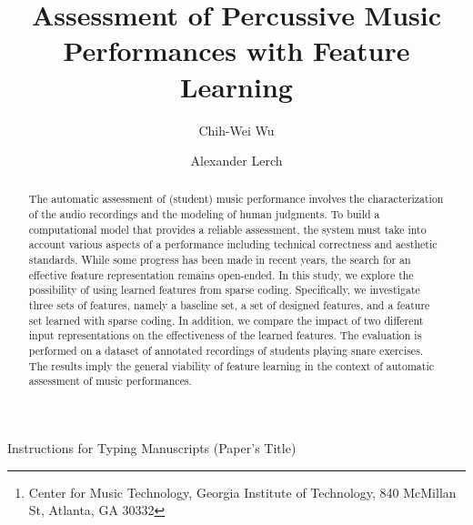 \documentclass{ws-ijsc}
\begin{document}
{Instructions for Typing Manuscripts (Paper's Title)}

%
\catchline{}{}{}{}{}
%

\title{Assessment of Percussive Music Performances with Feature Learning}


\author{Chih-Wei Wu}

\address{Center for Music Technology\\
Georgia Institute of Technology\,\footnote{Center for Music Technology, Georgia Institute of Technology, 840 McMillan St, Atlanta, GA 30332}\\
}

\author{Alexander Lerch}

\address{Center for Music Technology\\
Georgia Institute of Technology\\
alexander.lerch@gatech.edu
}

\maketitle

\begin{history}
\end{history}

\begin{abstract}
The automatic assessment of (student) music performance involves the characterization of the audio recordings and the modeling of human judgments. To build a computational model that provides a reliable assessment, the system must take into account various aspects of a performance including technical correctness and aesthetic standards. While some progress has been made in recent years, the search for an effective feature representation remains open-ended. In this study, we explore the possibility of using learned features from sparse coding. Specifically, we investigate three sets of features, namely a baseline set, a set of designed features, and a feature set learned with sparse coding. In addition, we compare the impact of two different input representations on the effectiveness of the learned features. The evaluation is performed on a dataset of annotated recordings of students playing snare exercises. The results imply the general viability of feature learning in the context of automatic assessment of music performances.   
\end{abstract}
\end{document}
